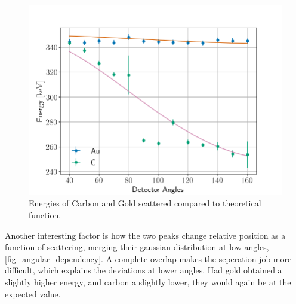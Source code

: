 \begin{figure}[t]
\centering
\includegraphics[width=0.99\columnwidth]{fig_energy}
\caption{Energies of Carbon and Gold scattered compared to theoretical
function.}
\label{fig_energy}
\end{figure}
Another interesting factor is how the two peaks change relative position as a
function of scattering, merging their gaussian distribution at low angles, \cref{fig_angular_dependency}. A complete overlap makes the seperation job more difficult, which explains the deviations at lower angles. Had gold obtained a slightly higher energy, and carbon a slightly lower, they would again be at the expected value.



